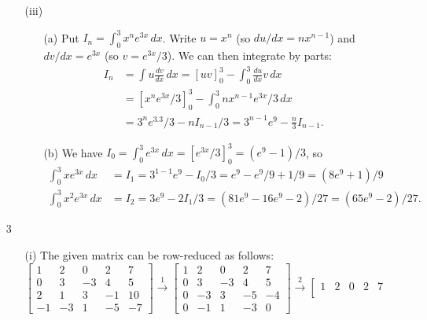 \documentclass{amsart}
\newcommand{\xra}{\xrightarrow}
\renewcommand{\:}       {\colon}
\begin{document}
\begin{itemize}
\begin{itemize}
   \item[(iii)]
    \begin{itemize}
     \item[(a)]
      Put $I_n=\int_0^3 x^ne^{3x}\,dx$.  Write $u=x^n$ (so
      $du/dx=nx^{n-1}$) and $dv/dx=e^{3x}$ (so $v=e^{3x}/3$).  We can
      then integrate by parts:
      \begin{align*}
       I_n &= \int u\frac{dv}{dx}\,dx = 
              \left[uv\right]_0^3 - \int_0^3\frac{du}{dx}v\,dx  \\
           &= \left[x^ne^{3x}/3\right]_0^3 - 
              \int_0^3 nx^{n-1}e^{3x}/3\,dx \\
           &= 3^ne^{3.3}/3 - n I_{n-1}/3 
            = 3^{n-1}e^9 - \frac{n}{3}I_{n-1} .
      \end{align*}
     \item[(b)]
      We have
      $I_0=\int_0^3e^{3x}\,dx=\left[e^{3x}/3\right]_0^3=(e^9-1)/3$,
      so 
      \begin{align*}
       \int_0^3 xe^{3x}\,dx   &= I_1 = 3^{1-1}e^9-I_0/3 
                               = e^9-e^9/9+1/9 = (8e^9 +1)/9 \\
       \int_0^3 x^2e^{3x}\,dx &= I_2 = 3e^9-2I_1/3
                               = (81 e^9 - 16e^9 - 2)/27 
                               = (65 e^9 - 2)/27. 
      \end{align*}
    \end{itemize}
  \end{itemize}
 \item[3]
  \begin{itemize}
   \item[(i)]
    The given matrix can be row-reduced as follows:
    {\tiny
    \[
     \left[\begin{array}{ccccc}
      1 & 2 & 0 & 2 & 7 \\ 
      0 & 3 & -3 & 4 & 5 \\ 
      2 & 1 & 3 & -1 & 10 \\ 
      -1 & -3 & 1 & -5 & -7
     \end{array}\right] \xra{1}
     \left[\begin{array}{ccccc}
      1 & 2 & 0 & 2 & 7 \\ 
      0 & 3 & -3 & 4 & 5 \\ 
      0 & -3 & 3 & -5 & -4 \\ 
      0 & -1 & 1 & -3 & 0
     \end{array}\right] \xra{2}
     \left[\begin{array}{ccccc}
      1 & 2 & 0 & 2 & 7 \\ 

\end{array}\]}
\end{itemize}
\end{itemize}
\end{document}
